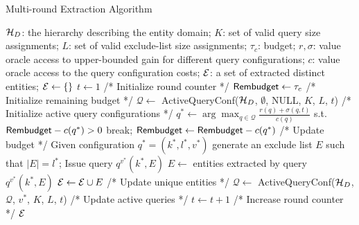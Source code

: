 \begin{algorithm}[h]
\footnotesize\caption{Multi-round Extraction Algorithm}
\label{algo:overall}
\begin{algorithmic}[1]
 $\mathcal{H}_D$: the hierarchy describing the entity domain; $K$: set of valid query size assignments; $L$: set of valid exclude-list size assignments; $\tau_c$: budget; $r,\sigma$: value oracle access to upper-bounded gain for different query configurations; $c$: value oracle access to the query configuration costs;
 $\mathcal{E}$: a set of extracted distinct entities;
\STATE $\mathcal{E} \leftarrow \{\}$
\STATE $t \leftarrow 1$ /* Initialize round counter */
\STATE ${\sf Rembudget} \leftarrow \tau_c$ /* Initialize remaining budget */
\STATE $\mathcal{Q} \leftarrow$ {\sf ActiveQueryConf($\mathcal{H}_D$, $\emptyset$, NULL, $K$, $L$, $t$)} /* Initialize active query configurations */
	\STATE $q^* \leftarrow \arg\max_{q \in {\mathcal{Q}}} \frac{r(q)+\sigma(q,t)}{c(q)}$ s.t. ${\sf Rembudget} - c(q^*) >0$
		\STATE break;
	\ENDIF
	\STATE ${\sf Rembudget} \leftarrow {\sf Rembudget} - c(q^*)$ /* Update budget */
	\STATE Given configuration $q^* = (k^*,l^*,v^*)$ generate an exclude list $E$ such that $|E| = l^*$; 
	\STATE Issue query $q^{v^{*}}(k^*,E)$
	\STATE $E \leftarrow$ entities extracted by query $q^{v^{*}}(k^*,E)$
	\STATE $\mathcal{E} \leftarrow \mathcal{E} \cup E$ /* Update unique entities */
	\STATE $\mathcal{Q} \leftarrow$ {\sf ActiveQueryConf($\mathcal{H}_D$, $\mathcal{Q}$, $v^*$, $K$, $L$, $t$)} /* Update active queries */
	\STATE $t \leftarrow t + 1$ /* Increase round counter */
\ENDWHILE
\RETURN $\mathcal{E}$
\end{algorithmic}
\end{algorithm}
